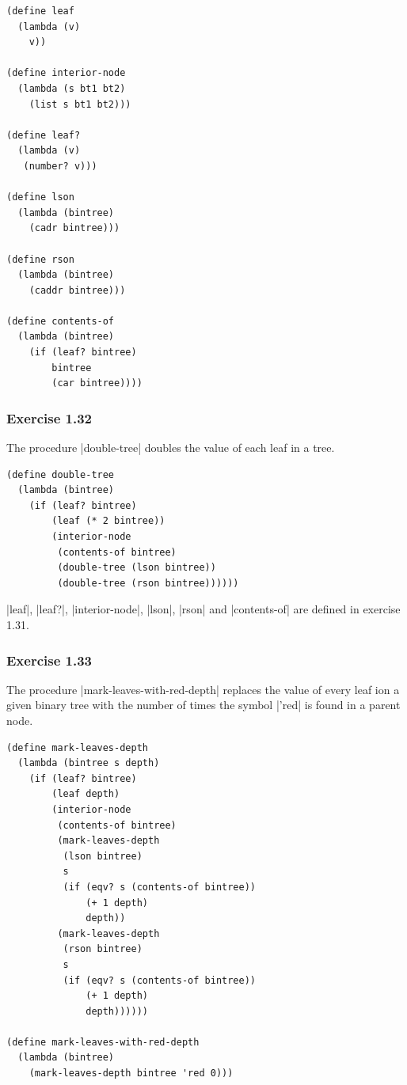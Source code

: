 \documentclass[a4paper]{article}
\begin{document}
\begin{lstlisting}
(define leaf
  (lambda (v)
    v))

(define interior-node
  (lambda (s bt1 bt2)
    (list s bt1 bt2)))

(define leaf?
  (lambda (v)
   (number? v)))

(define lson
  (lambda (bintree)
    (cadr bintree)))

(define rson
  (lambda (bintree)
    (caddr bintree)))

(define contents-of
  (lambda (bintree)
    (if (leaf? bintree)
        bintree
        (car bintree))))
\end{lstlisting}

\subsubsection{Exercise 1.32}

The procedure |double-tree| doubles the value of each leaf in a tree.

\begin{lstlisting}
(define double-tree
  (lambda (bintree)
    (if (leaf? bintree)
        (leaf (* 2 bintree))
        (interior-node
         (contents-of bintree)
         (double-tree (lson bintree))
         (double-tree (rson bintree))))))
\end{lstlisting}

|leaf|, |leaf?|, |interior-node|, |lson|, |rson| and |contents-of| are defined in exercise 1.31.

\subsubsection{Exercise 1.33}

The procedure |mark-leaves-with-red-depth| replaces the value of every leaf ion a given binary tree with the number of times the symbol |'red| is found in a parent node.

\begin{lstlisting}
(define mark-leaves-depth
  (lambda (bintree s depth)
    (if (leaf? bintree)
        (leaf depth)
        (interior-node
         (contents-of bintree)
         (mark-leaves-depth
          (lson bintree)
          s
          (if (eqv? s (contents-of bintree))
              (+ 1 depth)
              depth))
         (mark-leaves-depth
          (rson bintree)
          s
          (if (eqv? s (contents-of bintree))
              (+ 1 depth)
              depth))))))

(define mark-leaves-with-red-depth
  (lambda (bintree)
    (mark-leaves-depth bintree 'red 0)))
\end{lstlisting}
\end{document}
